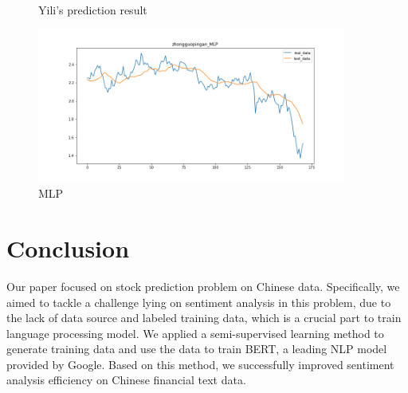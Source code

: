 \documentclass[runningheads]{llncs}
\begin{document}
\begin{figure} 
  \centering 
  \caption{Yili's prediction result} 
  \label{fig:Yili} %
\end{figure}

\begin{figure}
\centering\includegraphics[width=4in]{zhongguopingan_MLP.png}
\caption{MLP} \label{fig:MLPres}
\end{figure}

\section{Conclusion}
Our paper focused on stock prediction problem on Chinese data. Specifically, we aimed to tackle a challenge lying on sentiment analysis in this problem, due to the lack of data source and labeled training data, which is a crucial part to train language processing model. We applied a semi-supervised learning method to generate training data and use the data to train BERT, a leading NLP model provided by Google. Based on this method, we successfully improved sentiment analysis efficiency on Chinese financial text data.
\end{document}
